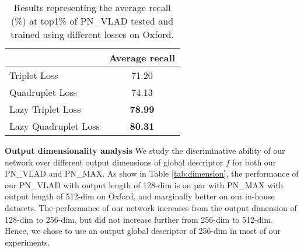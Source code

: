 \documentclass[10pt,twocolumn,letterpaper]{article}
\begin{document}
\begin{table}
	\begin{center}
		\begin{tabular}{|l|c|}
			\hline
			& Average recall\\
			\hline
			Triplet Loss& 71.20\\
			\hline
			Quadruplet Loss& 74.13\\
			\hline
			Lazy Triplet Loss& \textbf{78.99}\\
			\hline
			Lazy Quadruplet Loss& \textbf{80.31}\\
			\hline			
		\end{tabular}
	\end{center}
	\vspace{-0.1cm}
	\caption{Results representing the average recall (\%) at top1\% of PN\_VLAD tested and trained using different losses on Oxford.\vspace{-0.3cm} }
	\label{tab:losses}
\end{table}




\vspace{-0.2cm}
\noindent\textbf{Output dimensionality analysis} We study the discriminative ability of our network over different output dimensions of global descriptor $f$ for both our PN\_VLAD and PN\_MAX. As show in Table \ref{tab:dimension}, 
the performance of our PN\_VLAD with output length of 128-dim is on par with PN\_MAX with output length of 512-dim on Oxford, and marginally better on our in-house datasets.
The performance of our network increases from the output dimension of 128-dim to 256-dim, but did not increase further from 256-dim to 512-dim. Hence, we chose to use an output global descriptor of 256-dim in most of our experiments.
\newline
\vspace{-0.2cm}
\end{document}
